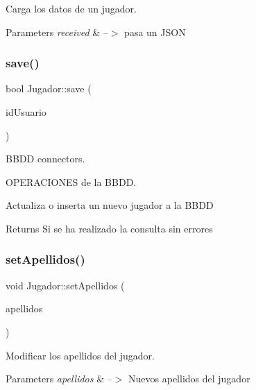 Carga los datos de un jugador. 


\begin{DoxyParams}{Parameters}
{\em received} & --$>$ pasa un J\+S\+ON \\
\hline
\end{DoxyParams}
\mbox{\label{classJugador_aeeb38c07c438551fd1d43a963e3b0b15}} 
\subsubsection{\texorpdfstring{save()}{save()}}
{\footnotesize\ttfamily bool Jugador\+::save (\begin{DoxyParamCaption}\item[{int}]{id\+Usuario }\end{DoxyParamCaption})}



B\+B\+DD connectors. 

O\+P\+E\+R\+A\+C\+I\+O\+N\+ES de la B\+B\+DD.

Actualiza o inserta un nuevo jugador a la B\+B\+DD \begin{DoxyReturn}{Returns}
Si se ha realizado la consulta sin errores 
\end{DoxyReturn}
\mbox{\label{classJugador_ad272be7c6b113eee1c9baf1262c4ad95}} 
\subsubsection{\texorpdfstring{set\+Apellidos()}{setApellidos()}}
{\footnotesize\ttfamily void Jugador\+::set\+Apellidos (\begin{DoxyParamCaption}\item[{Q\+String}]{apellidos }\end{DoxyParamCaption})}



Modificar los apellidos del jugador. 


\begin{DoxyParams}{Parameters}
{\em apellidos} & --$>$ Nuevos apellidos del jugador \\
\hline
\end{DoxyParams}
\mbox{\label{classJugador_af2b5ddb5d0b2cc80867ba54cf4cea564}} 
